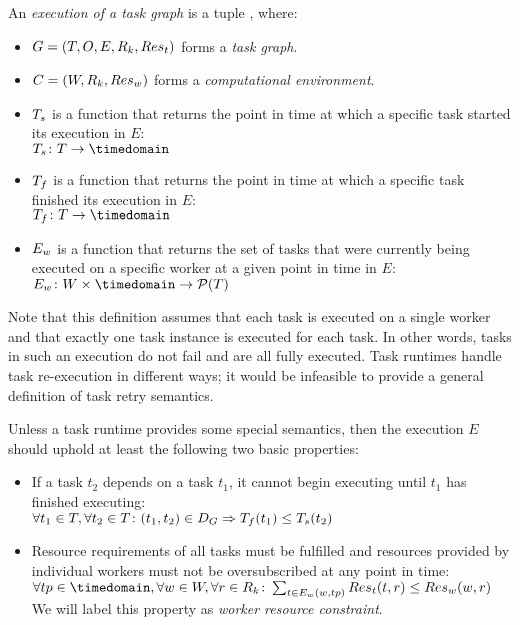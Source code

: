 \vspace{2mm} An \emph{execution of a task graph} is a tuple
\taskgraphexecution, where:
\begin{itemize}[itemsep=0pt]
	\item $G = (T, O, E, R_k, Res_t)$ forms a \emph{task graph}.
	\item $C = (W, R_k, Res_w)$ forms a \emph{computational environment}.
	\item $T_s$ is a function that returns the point in time at which a specific
	task started its execution in $E$: \\
	$\fntaskstart\colon T \rightarrow \timedomain$
	\item $T_f$ is a function that returns the point in time at which a specific
	task finished its execution in $E$: \\
	$\fntaskfinish\colon T \rightarrow \timedomain$
	\item $E_w$ is a function that returns the set of tasks that were currently
	being executed on a specific worker at a given point in time in $E$: \\
	$\fnworkertaskassigned\colon W \times \timedomain \rightarrow \powerset{T}$
\end{itemize}

Note that this definition assumes that each task is executed on a single worker and that exactly
one task instance is executed for each task. In other words, tasks in such an execution do not fail and
are all fully executed. Task runtimes handle task re-execution in different ways; it
would be infeasible to provide a general definition of task retry semantics.


Unless a task runtime provides some special semantics, then the execution $E$ should uphold at
least the following two basic properties:
\begin{itemize}
	\item If a task $t_2$ depends on a task $t_1$, it cannot begin
	executing until $t_1$ has finished executing: \\ $\forall t_1\in{}T, \forall t_2\in{}T\colon (t_1, t_2) \in D_G \Rightarrow T_f(t_1) \leq T_s(t_2)$
	\item[\makedef{def:worker_resource_constraint}] Resource requirements of all tasks must be fulfilled and resources provided by individual workers
	must not be oversubscribed at any point in time: \\ $\forall tp\in\timedomain, \forall w\in{}W, \forall
	r\in{}\setresourcekinds\colon
	\sum_{t\in{}\fnworkertaskassigned(w, tp)} \fntaskres(t, r) \leq
	\fnworkerres(w, r)$ \\ We will label this
	property as \emph{worker resource constraint}.
\end{itemize}

